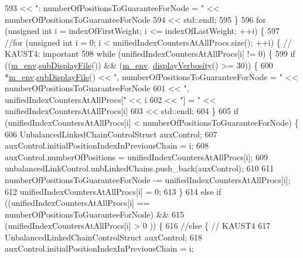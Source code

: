 \begin{DoxyCode}
593                             << \textcolor{stringliteral}{": numberOfPositionsToGuaranteeForNode = "} << 
      numberOfPositionsToGuaranteeForNode
594                             << std::endl;
595   \}
596   \textcolor{keywordflow}{for} (\textcolor{keywordtype}{unsigned} \textcolor{keywordtype}{int} i = indexOfFirstWeight; i <= indexOfLastWeight; ++i) \{
597 \textcolor{comment}{//for (unsigned int i = 0; i < unifiedIndexCountersAtAllProcs.size(); ++i) \{ // KAUST4: important}
598     \textcolor{keywordflow}{while} (unifiedIndexCountersAtAllProcs[i] != 0) \{
599       \textcolor{keywordflow}{if} ((\hyperlink{class_q_u_e_s_o_1_1_m_l_sampling_a13f1ca4fe9f94822fe572a743eaced1d}{m\_env}.\hyperlink{class_q_u_e_s_o_1_1_base_environment_a8a0064746ae8dddfece4229b9ad374d6}{subDisplayFile}()) && (\hyperlink{class_q_u_e_s_o_1_1_m_l_sampling_a13f1ca4fe9f94822fe572a743eaced1d}{m\_env}.
      \hyperlink{class_q_u_e_s_o_1_1_base_environment_a1fe5f244fc0316a0ab3e37463f108b96}{displayVerbosity}() >= 30)) \{
600         *\hyperlink{class_q_u_e_s_o_1_1_m_l_sampling_a13f1ca4fe9f94822fe572a743eaced1d}{m\_env}.\hyperlink{class_q_u_e_s_o_1_1_base_environment_a8a0064746ae8dddfece4229b9ad374d6}{subDisplayFile}() << \textcolor{stringliteral}{", numberOfPositionsToGuaranteeForNode = "} << 
      numberOfPositionsToGuaranteeForNode
601                                 << \textcolor{stringliteral}{", unifiedIndexCountersAtAllProcs["}        << i
602                                 << \textcolor{stringliteral}{"] = "}                                     << 
      unifiedIndexCountersAtAllProcs[i]
603                                 << std::endl;
604       \}
605       \textcolor{keywordflow}{if} (unifiedIndexCountersAtAllProcs[i] < numberOfPositionsToGuaranteeForNode) \{
606         UnbalancedLinkedChainControlStruct auxControl;
607         auxControl.initialPositionIndexInPreviousChain = i;
608         auxControl.numberOfPositions = unifiedIndexCountersAtAllProcs[i];
609         unbalancedLinkControl.unbLinkedChains.push\_back(auxControl);
610 
611         numberOfPositionsToGuaranteeForNode -= unifiedIndexCountersAtAllProcs[i];
612         unifiedIndexCountersAtAllProcs[i] = 0;
613       \}
614       \textcolor{keywordflow}{else} \textcolor{keywordflow}{if} ((unifiedIndexCountersAtAllProcs[i] == numberOfPositionsToGuaranteeForNode) &&
615                (unifiedIndexCountersAtAllProcs[i] > 0                                   )) \{
616       \textcolor{comment}{//else \{ // KAUST4}
617         UnbalancedLinkedChainControlStruct auxControl;
618         auxControl.initialPositionIndexInPreviousChain = i;

\end{DoxyCode}
